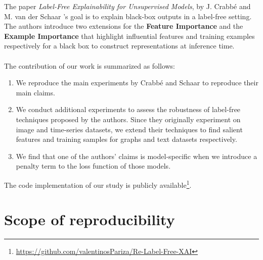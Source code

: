 The paper \textit{Label-Free Explainability for Unsupervised Models}, by J. Crabbé and M. van der Schaar \citep{mainpaper} 's goal is to explain black-box outputs in a label-free setting. The authors introduce two extensions for the \textbf{Feature Importance} and the \textbf{Example Importance} that highlight influential features and training examples respectively for a black box to construct representations at inference time. 
\\
\\
The contribution of our work is summarized as follows: 
\begin{enumerate}[noitemsep,topsep=0pt]
    \item We reproduce the main experiments by Crabbé and Schaar \citep{mainpaper} to reproduce their main claims.
    \item We conduct additional experiments to assess the robustness of label-free techniques proposed by the authors. Since they originally experiment on image and time-series datasets, we extend their techniques to find salient features and training samples for graphs and text datasets respectively.  
    \item We find that one of the authors' claims is model-specific when we introduce a penalty term to the loss function of those models.
\end{enumerate}

The code implementation of our study is publicly available\footnote{\url{https://github.com/valentinosPariza/Re-Label-Free-XAI}}.

\section{Scope of reproducibility}


